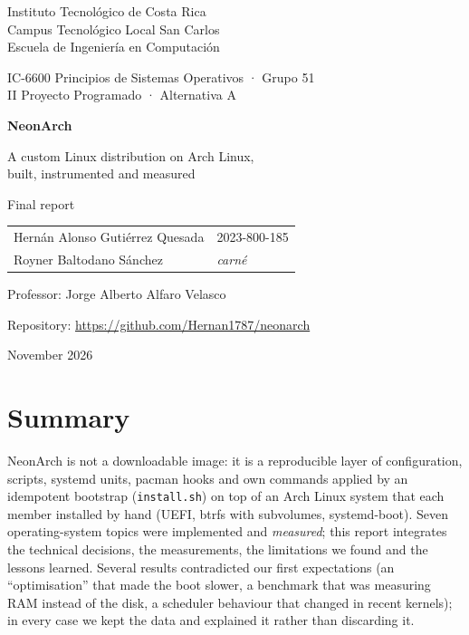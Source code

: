 \documentclass[10.5pt,a4paper]{article}
\newcommand{\cmd}[1]{\texttt{#1}}
\begin{document}
\begin{titlepage}
\centering
\vspace*{1.5cm}
{\large Instituto Tecnológico de Costa Rica\\ Campus Tecnológico Local San Carlos\\ Escuela de Ingeniería en Computación\par}
\vspace{0.6cm}
{\normalsize IC-6600 Principios de Sistemas Operativos · Grupo 51\\ II Proyecto Programado · Alternativa A\par}
\vspace{2.2cm}
{\Huge\bfseries\color{neon} NeonArch\par}
\vspace{0.3cm}
{\Large A custom Linux distribution on Arch Linux,\\ built, instrumented and measured\par}
\vspace{2.2cm}
{\large Final report\par}
\vspace{1.8cm}
\begin{tabular}{ll}
Hernán Alonso Gutiérrez Quesada & 2023-800-185\\
Royner Baltodano Sánchez & \textit{carné}\\
\end{tabular}
\vspace{1.4cm}

{Professor: Jorge Alberto Alfaro Velasco\par}
\vfill
{Repository: \url{https://github.com/Hernan1787/neonarch}\par}
\vspace{0.3cm}
{November 2026\par}
\end{titlepage}

\section*{Summary}
NeonArch is not a downloadable image: it is a reproducible layer of configuration, scripts, systemd units, pacman hooks and own commands applied by an idempotent bootstrap (\cmd{install.sh}) on top of an Arch Linux system that each member installed by hand (UEFI, btrfs with subvolumes, systemd-boot). Seven operating-system topics were implemented and \emph{measured}; this report integrates the technical decisions, the measurements, the limitations we found and the lessons learned. Several results contradicted our first expectations (an ``optimisation'' that made the boot slower, a benchmark that was measuring RAM instead of the disk, a scheduler behaviour that changed in recent kernels); in every case we kept the data and explained it rather than discarding it.
\end{document}
